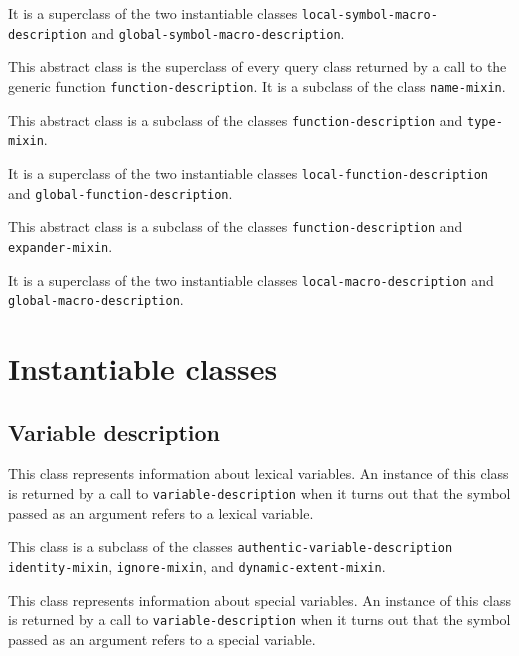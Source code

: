 It is a superclass of the two instantiable classes
\texttt{local-symbol-macro-description} and
\texttt{global-symbol-macro-description}.

{\footnotesize
{}
}

This abstract class is the superclass of every query class returned by
a call to the generic function \texttt{function-description}.  It is a
subclass of the class \texttt{name-mixin}.

{\footnotesize
{}
}

This abstract class is a subclass of the classes
\texttt{function-description} and \texttt{type-mixin}.

It is a superclass of the two instantiable classes
\texttt{local-function-description} and
\texttt{global-function-description}.

{\footnotesize
{}
}

This abstract class is a subclass of the classes
\texttt{function-description} and \texttt{expander-mixin}.

It is a superclass of the two instantiable classes
\texttt{local-macro-description} and
\texttt{global-macro-description}.

\section{Instantiable classes}

\subsection{Variable description}
\label{sec-instantiable-classes-variable-desciption}

{\footnotesize
{}
}

This class represents information about lexical variables.  An
instance of this class is returned by a call to \texttt{variable-description}
when it turns out that the symbol passed as an argument refers to a
lexical variable.

This class is a subclass of the classes
\texttt{authentic-variable-description} \texttt{identity-mixin},
\texttt{ignore-mixin}, and \texttt{dynamic-extent-mixin}.

{\footnotesize
{}
}

This class represents information about special variables.   An
instance of this class is returned by a call to \texttt{variable-description}
when it turns out that the symbol passed as an argument refers to a
special variable.

